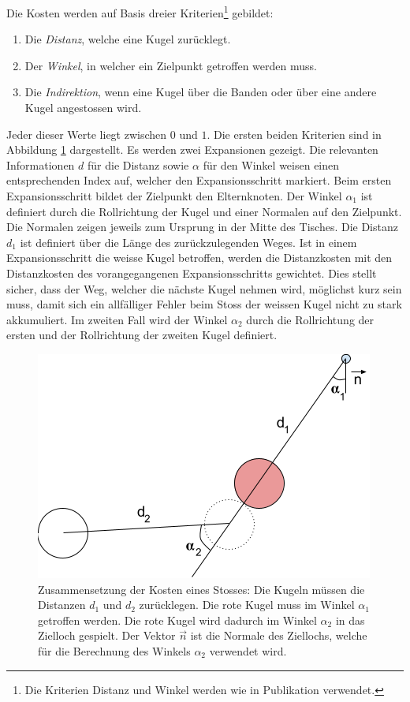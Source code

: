 Die Kosten werden auf Basis dreier Kriterien\footnote{Die Kriterien Distanz und Winkel werden wie
in Publikation \cite{inproceedings:billiard_ai:1} verwendet.} gebildet:
\begin{enumerate}
    \item Die \emph{Distanz}, welche eine Kugel zurücklegt.
    \item Der \emph{Winkel}, in welcher ein Zielpunkt getroffen werden muss.
    \item Die \emph{Indirektion}, wenn eine Kugel über die Banden oder über eine andere Kugel angestossen wird.
\end{enumerate}

Jeder dieser Werte liegt zwischen $0$ und $1$.
Die ersten beiden Kriterien sind in Abbildung \ref{fig:suche_knoten_expansionskosten} dargestellt.
Es werden zwei Expansionen gezeigt.
Die relevanten Informationen $d$ für die Distanz sowie $\alpha$ für den Winkel weisen
einen entsprechenden Index auf, welcher den Expansionsschritt markiert.
Beim ersten Expansionsschritt bildet der Zielpunkt
den Elternknoten.
Der Winkel $\alpha_1$ ist definiert durch die Rollrichtung der Kugel und einer Normalen auf den Zielpunkt.
Die Normalen zeigen jeweils zum Ursprung in der Mitte des Tisches.
Die Distanz $d_1$ ist definiert über die Länge des zurückzulegenden Weges.
Ist in einem Expansionsschritt die weisse Kugel betroffen, werden die Distanzkosten mit den
Distanzkosten des vorangegangenen Expansionsschritts gewichtet.
Dies stellt sicher, dass der Weg, welcher die nächste Kugel nehmen wird, möglichst kurz sein muss,
damit sich ein allfälliger Fehler beim Stoss der weissen Kugel nicht zu stark akkumuliert.
Im zweiten Fall wird der Winkel $\alpha_2$ durch die Rollrichtung der ersten und der Rollrichtung der zweiten Kugel definiert.

\begin{figure}[h!]
    \begin{center}
        \includegraphics[width=0.4\linewidth]{../common/03_billiard_ai/resources/29_suchbaum_expansionskosten.png}
    \end{center}
    \caption{Zusammensetzung der Kosten eines Stosses:
    Die Kugeln müssen die Distanzen $d_1$ und $d_2$ zurücklegen.
    Die rote Kugel muss im Winkel $\alpha_1$ getroffen werden.
    Die rote Kugel wird dadurch im Winkel $\alpha_2$ in das Zielloch gespielt.
    Der Vektor $\vec{n}$ ist die Normale des Ziellochs, welche für die Berechnung des Winkels $\alpha_2$ verwendet wird.
    }
    \label{fig:suche_knoten_expansionskosten}
\end{figure}

